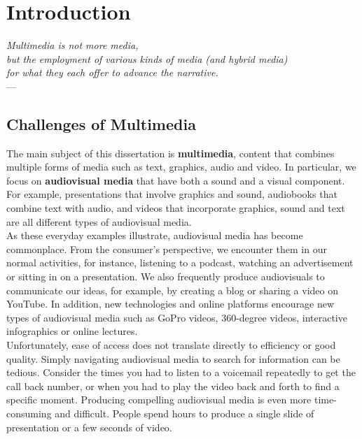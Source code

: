 
\chapter{Introduction} %

\label{ch:introduction} %

\begin{flushright}{\slshape    
Multimedia is not more media, \\ 
but the employment of various kinds of media (and hybrid media) \\ 
for what they each offer to advance the narrative.} \\ \medskip
---  \citep{ritchin:2013}
\end{flushright}

\section{Challenges of Multimedia}
The main subject of this dissertation is \textbf{multimedia}, content that combines multiple forms of media such as text, graphics, audio and video. In particular, we focus on \textbf{audiovisual media} that have both a sound and a visual component. For example, presentations that involve graphics and sound, audiobooks that combine text with audio, and videos that incorporate graphics, sound and text are all different types of audiovisual media. \\

As these everyday examples illustrate, audiovisual media has become commonplace. From the consumer's perspective, we encounter them in our normal activities, for instance, listening to a podcast, watching an advertisement or sitting in on a presentation. We also frequently produce audiovisuals to communicate our ideas, for example, by creating a blog or sharing a video on YouTube. In addition, new technologies and online platforms encourage new types of audiovisual media such as GoPro videos, 360-degree videos, interactive infographics or online lectures.\\ 

Unfortunately, ease of access does not translate directly to efficiency or good quality. Simply navigating audiovisual media to search for information can be tedious. Consider the times you had to listen to a voicemail repeatedly to get the call back number, or when you had to play the video back and forth to find a specific moment. Producing compelling audiovisual media is even more time-consuming and difficult. People spend hours to produce a single slide of presentation or a few seconds of video.\\ 

